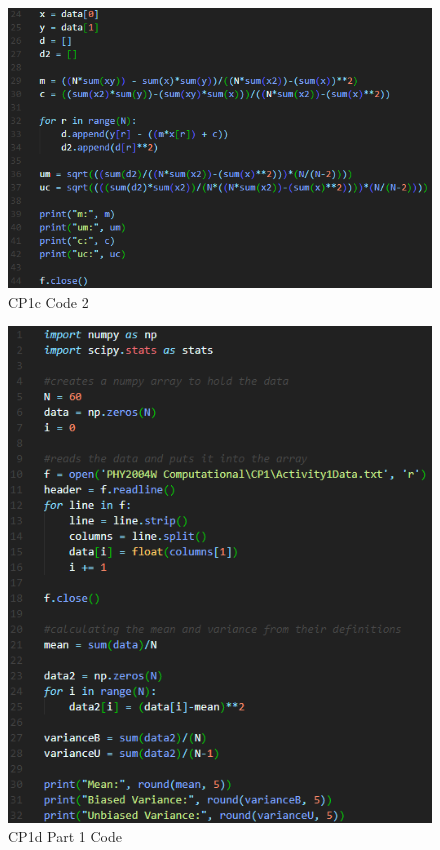 \documentclass[12pt]{article}
\begin{document}
    \begin{figure}[H]
        \begin{center}
           \includegraphics[scale=0.7]{CP1c code 2.png}
           \caption{CP1c Code 2}
           \label{Appendix 4}
        \end{center}
    \end{figure}
    
    \begin{figure}[H]
        \begin{center}
           \includegraphics[scale=0.7]{CP1d part 1 code.png}
           \caption{CP1d Part 1 Code}
           \label{Appendix 5}
        \end{center}
    \end{figure}
    
    
\end{document}
